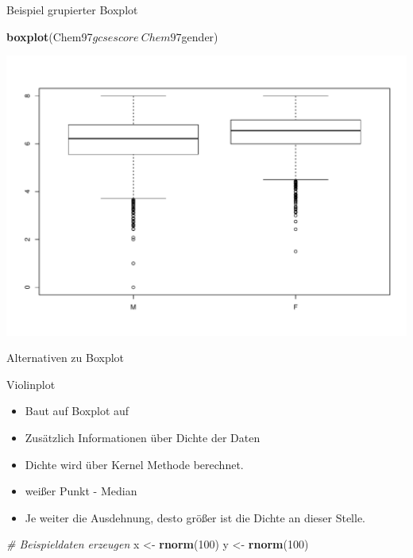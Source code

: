 \documentclass[ignorenonframetext,]{beamer}
\newenvironment{Shaded}{}{}
\newcommand{\KeywordTok}[1]{\textcolor[rgb]{0.00,0.44,0.13}{\textbf{{#1}}}}
\newcommand{\DecValTok}[1]{\textcolor[rgb]{0.25,0.63,0.44}{{#1}}}
\newcommand{\StringTok}[1]{\textcolor[rgb]{0.25,0.44,0.63}{{#1}}}
\newcommand{\CommentTok}[1]{\textcolor[rgb]{0.38,0.63,0.69}{\textit{{#1}}}}
\newcommand{\NormalTok}[1]{{#1}}
\providecommand{\tightlist}{%
\setlength{\itemsep}{0pt}\setlength{\parskip}{0pt}}
\begin{document}
\begin{frame}[fragile]{Beispiel grupierter Boxplot}

\begin{Shaded}
\begin{Highlighting}[]
\KeywordTok{boxplot}\NormalTok{(Chem97$gcsescore~Chem97$gender)}
\end{Highlighting}
\end{Shaded}

\includegraphics{R_intern_files/figure-beamer/unnamed-chunk-166-1.pdf}

\end{frame}

\begin{frame}[fragile]{Alternativen zu Boxplot}

Violinplot

\begin{itemize}
\tightlist
\item
  Baut auf Boxplot auf
\item
  Zusätzlich Informationen über Dichte der Daten
\item
  Dichte wird über Kernel Methode berechnet.
\item
  weißer Punkt - Median
\item
  Je weiter die Ausdehnung, desto größer ist die Dichte an dieser
  Stelle.
\end{itemize}

\begin{Shaded}
\begin{Highlighting}[]
\CommentTok{# Beispieldaten erzeugen}
\NormalTok{x <-}\StringTok{ }\KeywordTok{rnorm}\NormalTok{(}\DecValTok{100}\NormalTok{)}
\NormalTok{y <-}\StringTok{ }\KeywordTok{rnorm}\NormalTok{(}\DecValTok{100}\NormalTok{)}
\end{Highlighting}
\end{Shaded}

\end{frame}
\end{document}
